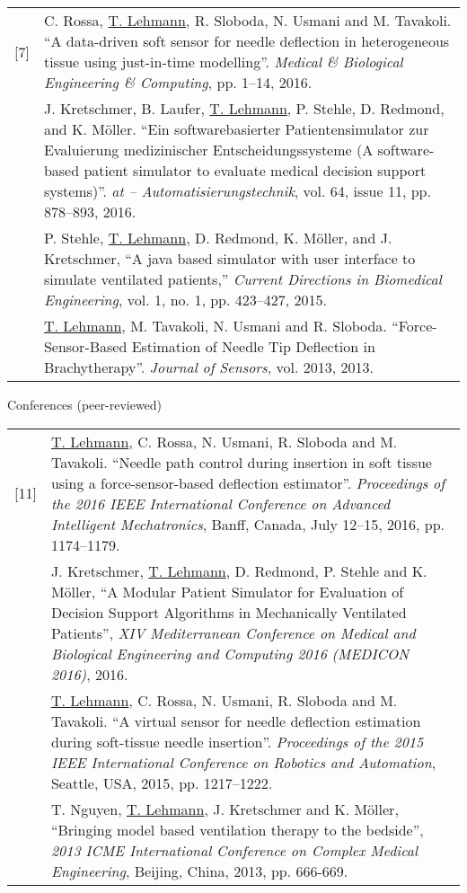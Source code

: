 \begin{cventries}
{\begin{tabular}{p{0.5cm} p{\textwidth - 0.5cm}}
        [7] & C. Rossa, \underline{T. Lehmann}, R. Sloboda, N. Usmani and M. Tavakoli. ``A data-driven soft sensor for needle deflection in heterogeneous tissue using just-in-time modelling''. \emph{Medical \& Biological Engineering \& Computing}, pp. 1--14, 2016. \\\relax
        [8] & J. Kretschmer, B. Laufer, \underline{T. Lehmann}, P. Stehle, D. Redmond, and K. M\"oller. ``Ein softwarebasierter Patientensimulator zur Evaluierung medizinischer Entscheidungssysteme (A software-based patient simulator to evaluate medical decision support systems)''. \emph{at -- Automatisierungstechnik}, vol. 64, issue 11, pp. 878--893, 2016. \\\relax
        [9] & P. Stehle, \underline{T. Lehmann}, D. Redmond, K. M\"{o}ller, and J. Kretschmer, ``A java based simulator with user interface to simulate ventilated patients,'' \emph{Current Directions in Biomedical Engineering}, vol. 1, no. 1, pp. 423--427, 2015. \\\relax
        [10] & \underline{T. Lehmann}, M. Tavakoli, N. Usmani and R. Sloboda. ``Force-Sensor-Based Estimation of Needle Tip Deflection in Brachytherapy''. \emph{Journal of Sensors}, vol. 2013, 2013.
    \end{tabular}
  }
  \cvpub
    {Conferences (peer-reviewed)}{
      \begin{tabular}{p{0.5cm} p{\textwidth - 0.5cm}}
        [11] & \underline{T. Lehmann}, C. Rossa, N. Usmani, R. Sloboda and M. Tavakoli. ``Needle path control during insertion in soft tissue using a force-sensor-based deflection estimator''. \emph{Proceedings of the 2016 IEEE International Conference on Advanced Intelligent Mechatronics}, Banff, Canada, July 12--15, 2016, pp. 1174--1179. \\\relax
        [12] & J. Kretschmer, \underline{T. Lehmann}, D. Redmond, P. Stehle and K. M\"oller, ``A Modular Patient Simulator for Evaluation of Decision Support Algorithms in Mechanically Ventilated Patients'', \emph{XIV Mediterranean Conference on Medical and Biological Engineering and Computing 2016 (MEDICON 2016)}, 2016. \\\relax
        [13] & \underline{T. Lehmann}, C. Rossa, N. Usmani, R. Sloboda and M. Tavakoli. ``A virtual sensor for needle deflection estimation during soft-tissue needle insertion''.  \emph{Proceedings of the 2015 IEEE International Conference on Robotics and Automation}, Seattle, USA, 2015, pp. 1217--1222. \\\relax
        [14] & T. Nguyen, \underline{T. Lehmann}, J. Kretschmer and K. M\"{o}ller, ``Bringing model based ventilation therapy to the bedside'', \emph{2013 ICME International Conference on Complex Medical Engineering}, Beijing, China, 2013, pp. 666-669.
      \end{tabular}
    }
\end{cventries}
